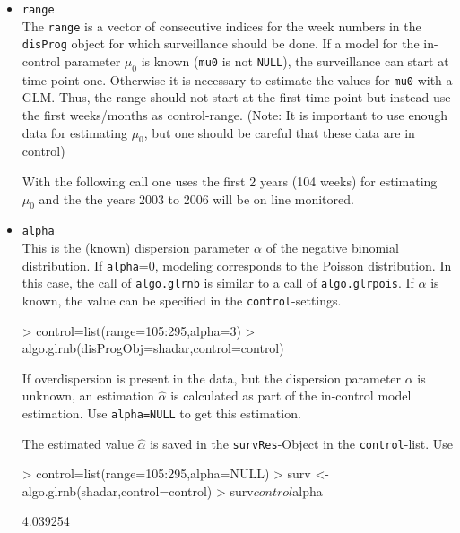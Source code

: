\documentclass[a4paper,11pt]{article}
\begin{document}
\begin{itemize}
\item \verb+range+ \\
The \verb+range+ is a vector of consecutive indices for the week numbers in the \verb+disProg+ object for which surveillance should be done. If a model for the in-control parameter $\mu_0$ is known (\verb+mu0+ is not \verb+NULL+), the surveillance can start at time point one. Otherwise it is necessary to estimate the values for \verb+mu0+ with a GLM. Thus, the range should not start at the first time point but instead use the first weeks/months as control-range. (Note: It is important to use enough data for estimating $\mu_0$, but one should be careful that these data are in control)

With the following call one uses the first 2 years (104 weeks) for estimating $\mu_0$ and the the years 2003 to 2006 will be on line monitored.
\begin{Schunk}
\end{Schunk}

\item \verb+alpha+ \\
This is the (known) dispersion parameter $\alpha$ of the negative binomial distribution. If \verb+alpha+=0, modeling corresponds to the Poisson distribution. In this case, the call of \verb+algo.glrnb+ is similar to a call of \verb+algo.glrpois+. If $\alpha$ is known, the value can be specified in the \verb+control+-settings.

\begin{Schunk}
\begin{Sinput}
> control=list(range=105:295,alpha=3)
> algo.glrnb(disProgObj=shadar,control=control)
\end{Sinput}
\end{Schunk}

If overdispersion is present in the data, but the dispersion parameter $\alpha$ is unknown, an estimation $\hat{\alpha}$ is calculated as part of the in-control model estimation. Use \verb+alpha=NULL+ to get this estimation. 


The estimated value $\hat{\alpha}$ is saved in the \verb+survRes+-Object in the \verb+control+-list. Use

\begin{Schunk}
\begin{Sinput}
> control=list(range=105:295,alpha=NULL)
> surv <- algo.glrnb(shadar,control=control)
> surv$control$alpha
\end{Sinput}
\begin{Soutput}
[1] 4.039254
\end{Soutput}
\end{Schunk}


\end{itemize}
\end{document}
